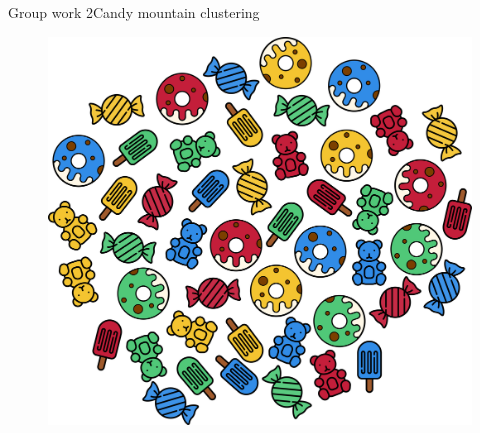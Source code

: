 \documentclass[aspectratio=169]{beamer}
\begin{document}
  \begin{frame}{Group work 2}{Candy mountain clustering}
    \begin{figure}
      \includegraphics[width=0.50\linewidth]{Figures/Candy_mountain}
    \end{figure}
  \end{frame}
\end{document}

